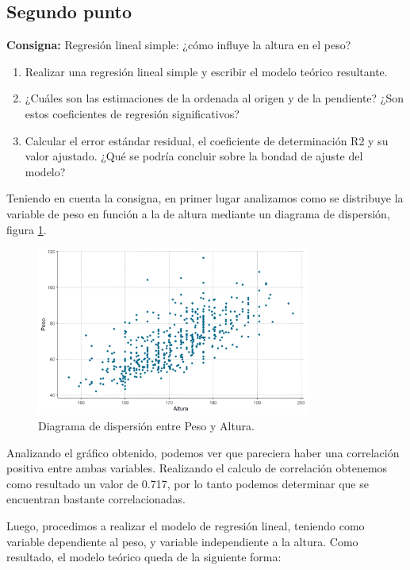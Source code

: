 \documentclass{article} %
\begin{document}
\subsection{Segundo punto}

\textbf{Consigna:} Regresión lineal simple: ¿cómo influye la altura en el peso?

\begin{enumerate}[label=(\alph*)]
\item Realizar una regresión lineal simple y escribir el modelo teórico resultante.
\item ¿Cuáles son las estimaciones de la ordenada al origen y de la pendiente? ¿Son estos coeficientes de regresión significativos?
\item Calcular el error estándar residual, el coeficiente de determinación R2 y su valor ajustado. ¿Qué se podría concluir sobre la bondad de ajuste del modelo?
\end{enumerate}

Teniendo en cuenta la consigna, en primer lugar analizamos como se distribuye la variable de peso en función a la de altura mediante un diagrama de dispersión, figura \ref{fig:scatter1}. 


\begin{figure}[H]
	\centering
	\includegraphics[width=0.8\textwidth]{images/1-2 Scatter}
	\caption{Diagrama de dispersión entre Peso y Altura.}
	\label{fig:scatter1}
\end{figure}

Analizando el gráfico obtenido, podemos ver que pareciera haber una correlación positiva entre ambas variables. Realizando el calculo de correlación obtenemos como resultado un valor de 0.717, por lo tanto podemos determinar que se encuentran bastante correlacionadas. 

Luego, procedimos a realizar el modelo de regresión lineal, teniendo como variable dependiente al peso, y variable independiente a la altura. Como resultado, el modelo teórico queda de la siguiente forma:
\end{document}
